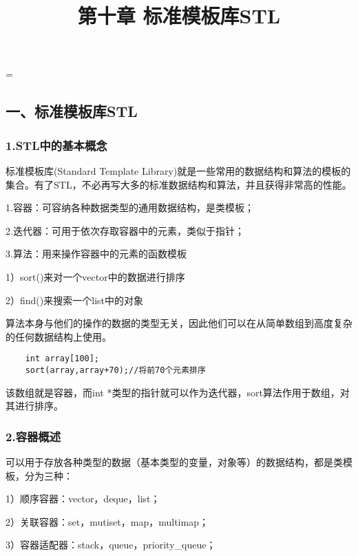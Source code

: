 \documentclass{article}
\begin{document}
 
\hfuzz=\maxdimen
{}
\begin{CJK}{UTF8}{gbsn}  
\title{第十章  标准模板库STL}
\author{}
\date{}
\maketitle
\part*{一、标准模板库STL}
\section*{1.STL中的基本概念}
\subparagraph*{}
标准模板库(Standard Template Library)就是一些常用的数据结构和算法的模板的集合。有了STL，不必再写大多的标准数据结构和算法，并且获得非常高的性能。
\subparagraph*{}
1.容器：可容纳各种数据类型的通用数据结构，是类模板；
\subparagraph*{}
2.迭代器：可用于依次存取容器中的元素，类似于指针；
\subparagraph*{}
3.算法：用来操作容器中的元素的函数模板
\subparagraph*{}
1）sort()来对一个vector中的数据进行排序
\subparagraph*{}
2）find()来搜索一个list中的对象
\subparagraph*{}
算法本身与他们的操作的数据的类型无关，因此他们可以在从简单数组到高度复杂的任何数据结构上使用。
\begin{verbatim}
    int array[100];
    sort(array,array+70);//将前70个元素排序
\end{verbatim}
\subparagraph*{}
该数组就是容器，而int *类型的指针就可以作为迭代器，sort算法作用于数组，对其进行排序。
\section*{2.容器概述}
\subparagraph*{}
可以用于存放各种类型的数据（基本类型的变量，对象等）的数据结构，都是类模板，分为三种：
\subparagraph*{}
1）顺序容器：vector，deque，list；
\subparagraph*{}
2）关联容器：set，mutiset，map，multimap；
\subparagraph*{}
3）容器适配器：stack，queue，priority\_queue；

\end{CJK}
\end{document}

